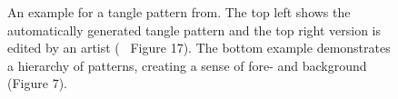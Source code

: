\begin{figure}[H]
    \centering
    \caption{\label{fig:santoni_2016_ggp_frames}An example for a tangle pattern from. The top left shows the automatically generated tangle pattern and the top right version is edited by an artist (~\cite{santoni_2016_ggp} Figure 17). The bottom example demonstrates a hierarchy of patterns, creating a sense of fore- and background (Figure 7).}
\end{figure}

